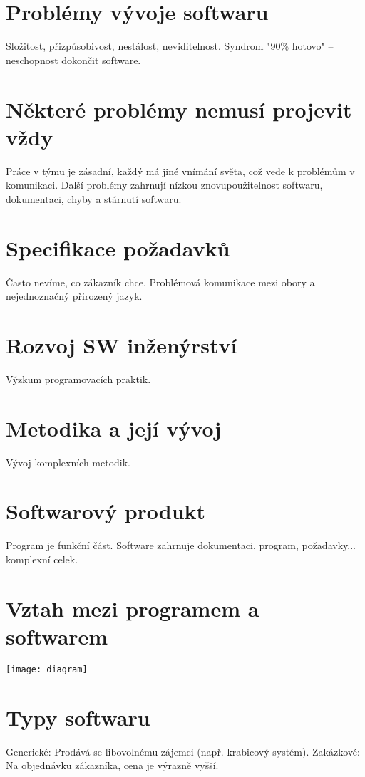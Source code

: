 \documentclass{article}
\begin{document}
\section{Problémy vývoje softwaru}
Složitost, přizpůsobivost, nestálost, neviditelnost. Syndrom "90\% hotovo" – neschopnost dokončit software.

\section{Některé problémy nemusí projevit vždy}
Práce v týmu je zásadní, každý má jiné vnímání světa, což vede k problémům v komunikaci. Další problémy zahrnují nízkou znovupoužitelnost softwaru, dokumentaci, chyby a stárnutí softwaru.

\section{Specifikace požadavků}
Často nevíme, co zákazník chce. Problémová komunikace mezi obory a nejednoznačný přirozený jazyk.

\section{Rozvoj SW inženýrství}
Výzkum programovacích praktik.

\section{Metodika a její vývoj}
Vývoj komplexních metodik.

\section{Softwarový produkt}
Program je funkční část. Software zahrnuje dokumentaci, program, požadavky... komplexní celek.

\section{Vztah mezi programem a softwarem}
\texttt{[image: diagram]} %

\section{Typy softwaru}
Generické: Prodává se libovolnému zájemci (např. krabicový systém).
Zakázkové: Na objednávku zákazníka, cena je výrazně vyšší.
\end{document}
